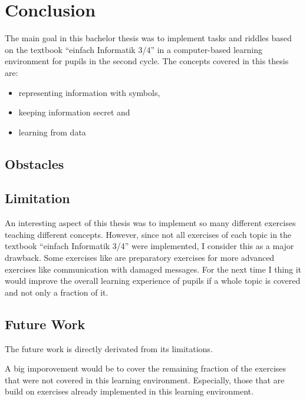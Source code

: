 \chapter{Conclusion}
\label{chapter:conclusion}

The main goal in this bachelor thesis was to implement tasks and riddles based on the textbook “einfach Informatik 3/4” in a computer-based learning environment for pupils in the second cycle. The concepts covered in this thesis are:

\begin{itemize}
    \item representing information with symbols,
    \item keeping information secret and
    \item learning from data
\end{itemize}

\section{Obstacles}


\section{Limitation}

An interesting aspect of this thesis was to implement so many different exercises teaching different concepts. However, since not all exercises of each topic in the textbook “einfach Informatik 3/4” were implemented, I consider this as a major drawback. Some exercises like  are preparatory exercises for more advanced exercises like communication with damaged messages. For the next time I thing it would improve the overall learning experience of pupils if a whole topic is covered and not only a fraction of it.


\section{Future Work}

The future work is directly derivated from its limitations.

A big imporovement would be to cover the remaining fraction of the exercises that were not covered in this learning environment. Especially, those that are build on exercises already implemented in this learning environment.

